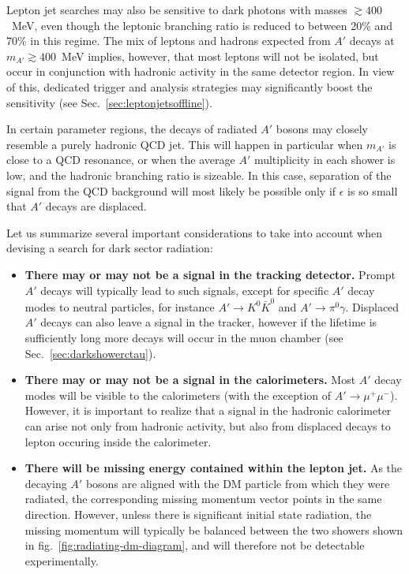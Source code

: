 Lepton jet searches may also be sensitive to dark photons
with masses $\gtrsim 400$~MeV, even though the leptonic branching ratio is reduced
to between 20\% and 70\% in this regime. The mix of leptons and hadrons
expected from $A'$ decays at $m_{A'} \gtrsim 400$~MeV implies, however,
that most leptons will not be isolated, but occur in conjunction with hadronic
activity in the same detector region.  In view of this, dedicated trigger and
analysis strategies may significantly boost the sensitivity (see Sec.~\ref{sec:leptonjetsoffline}). 

In certain parameter regions, the decays of radiated $A'$ bosons may closely
resemble a purely hadronic QCD jet. This will happen in particular when $m_{A'}$
is close to a QCD resonance, or when the average $A'$ multiplicity in each
shower is low, and the hadronic branching ratio is sizeable. In this case,
separation of the signal from the QCD background will most likely be possible
only if $\epsilon$ is so small that $A'$ decays are displaced.

Let us summarize several important considerations to take into account when
devising a search for dark sector radiation:
\begin{itemize}
  \item {\bf There may or may not be a signal in the tracking detector.}
    Prompt $A'$ decays will typically lead to such signals, except for specific
    $A'$ decay modes to neutral particles, for instance $A' \to K^0 \bar{K}^0$
    and $A' \to \pi^0 \gamma$. Displaced $A'$ decays can also leave a signal in the tracker, 
    however if the lifetime is sufficiently long more decays will occur in the muon chamber (see Sec.~\ref{sec:darkshowerctau}). 

  \item {\bf There may or may not be a signal in the calorimeters.} Most $A'$
    decay modes will be visible to the calorimeters (with the exception of $A'
    \to \mu^+ \mu^-$). However, it is important to realize that a signal in the
    hadronic calorimeter can arise not only from hadronic activity, but also
    from displaced decays to lepton occuring inside the calorimeter.
  
  \item {\bf There will be missing energy contained within the lepton jet.}
    As the decaying $A'$ bosons are aligned with the DM particle from which
    they were radiated, the corresponding missing momentum vector points in
    the same direction. However, unless there is significant initial
    state radiation, the missing momentum will typically be balanced between
    the two showers shown in fig.~\ref{fig:radiating-dm-diagram}, and
    will therefore not be detectable experimentally. 
\end{itemize}

